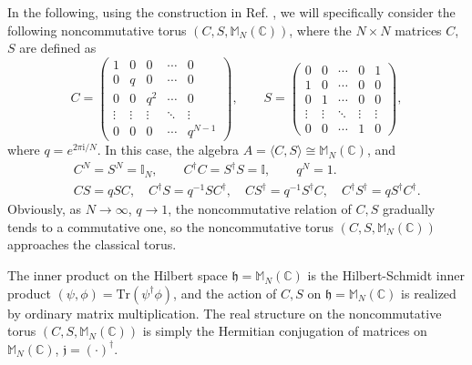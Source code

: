 \documentclass[a4paper,11pt]{article}
\begin{document}
In the following, using the construction in Ref. \cite{Bigatti1}, we will
specifically consider the following noncommutative torus $(C, S,  \mathbb{M}_N
(\mathbb{C}))$, where the $N \times N$ matrices $C$, $S$ are defined as
\begin{equation}\label{cs}
  C = \left( \begin{array}{ccccc}
    1 & 0 & 0 & \cdots & 0\\
    0 & q & 0 & \cdots & 0\\
    0 & 0 & q^2 & \cdots & 0\\
    \vdots & \vdots & \vdots & \ddots & \vdots\\
    0 & 0 & 0 & \cdots & q^{N - 1}
  \end{array} \right), \qquad S = \left( \begin{array}{ccccc}
    0 & 0 & \cdots & 0 & 1\\
    1 & 0 & \cdots & 0 & 0\\
    0 & 1 & \cdots & 0 & 0\\
    \vdots & \vdots & \ddots & \vdots & \vdots\\
    0 & 0 & \cdots & 1 & 0
  \end{array} \right),
\end{equation}
where $q = e^{2 \pi \mathrm{i} / N}$. In this case, the algebra $A = \langle C, S
\rangle \cong  \mathbb{M}_N (\mathbb{C})$, and
\begin{eqnarray}
&&  C^N = S^N =\mathbb{I}_N, \qquad C^{\dag} C = S^{\dag} S
  =\mathbb{I}, \qquad q^N = 1.
\nonumber\\
&&	CS = qSC, \quad C^{\dag}S = q^{-1}SC^{\dag}, \quad CS^{\dag} = q^{-1}S^{\dag}C, \quad C^{\dag}S^{\dag} = qS^{\dag}C^{\dag}.
\end{eqnarray}
Obviously, as $N \to \infty$, $q \to 1$, the noncommutative relation of $C, S$
gradually tends to a commutative one, so the noncommutative torus $(C, S,  \mathbb{M}_N
(\mathbb{C}))$ approaches the classical torus.

The inner product on the Hilbert space $\mathfrak{h}=  \mathbb{M}_N (\mathbb{C})$ is the
Hilbert-Schmidt inner product $(\psi, \phi) = \mathrm{Tr} (\psi^{\dag} \phi)$,
and the action of $C, S$ on $\mathfrak{h}=  \mathbb{M}_N (\mathbb{C})$ is realized by
ordinary matrix multiplication. The real structure on the noncommutative torus
$(C, S,  \mathbb{M}_N (\mathbb{C}))$ is simply the Hermitian conjugation of matrices on
$ \mathbb{M}_N (\mathbb{C})$, $\mathfrak{j}= (\cdot)^{\dag}$.
\end{document}
